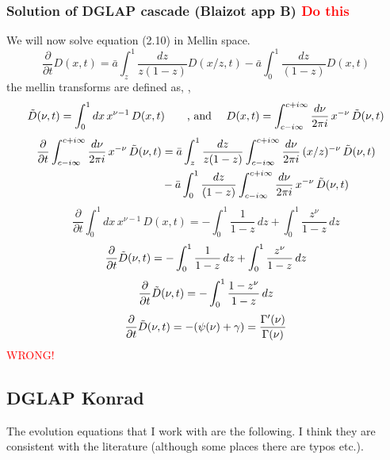 \documentclass[main.tex]{subfiles}
\begin{document}
\subsubsection{Solution of DGLAP cascade (Blaizot app B) \textcolor{red}{Do this}}
We will now solve equation (2.10) in Mellin space.
\begin{equation}\label{eqn: blaizot_2.10}
    \frac{\partial}{\partial t} D(x,t) = \bar a \int_z^1 \frac{dz}{z(1-z)} D(x/z,t) - \bar a \int_0^1 \frac{dz}{(1-z)} D(x,t)
\end{equation}
the mellin transforms are defined as, \cite{Energy_flow_medium_cascade_2016},
\begin{equation*}\label{eqn: mellin_transforms}
    \Tilde{D}(\nu, t) = \int_0^1 dx\, x^{\nu-1} \, D(x,t) \qquad \text{, and }\quad D(x,t) = \int_{c-i\infty}^{c+i\infty} \frac{d\nu}{2\pi i}\, x^{-\nu} \, \Tilde{D}(\nu, t)
\end{equation*}
\begin{align*}
    \frac{\partial}{\partial t} \int_{c-i\infty}^{c+i\infty} \frac{d\nu}{2\pi i}\, x^{-\nu} \, \Tilde{D}(\nu, t) &= \bar a \int_z^1 \frac{dz}{z(1-z)} \int_{c-i\infty}^{c+i\infty} \frac{d\nu}{2\pi i}\, (x/z)^{-\nu} \, \Tilde{D}(\nu, t) \\
    &- \bar a \int_0^1 \frac{dz}{(1-z)} \int_{c-i\infty}^{c+i\infty} \frac{d\nu}{2\pi i}\, x^{-\nu} \, \Tilde{D}(\nu, t)
\end{align*}
\begin{equation*}
    \frac{\partial}{\partial t} \int_0^1 dx\, x^{\nu-1} \, D(x,t) = -\int_0^1 \frac{1}{1-z}\, dz +\int_0^1 \frac{z^\nu}{1-z}\, dz 
\end{equation*}
\begin{equation*}
    \frac{\partial}{\partial t} \Tilde{D}(\nu, t) = -\int_0^1 \frac{1}{1-z}\, dz +\int_0^1 \frac{z^\nu}{1-z}\, dz 
\end{equation*}
\begin{equation*}
    \frac{\partial}{\partial t} \Tilde{D}(\nu, t) = -\int_0^1 \frac{1-z^\nu}{1-z}\, dz 
\end{equation*}
\begin{equation*}
    \frac{\partial}{\partial t} \Tilde{D}(\nu, t) = -(\psi(\nu)+\gamma) = \frac{\Gamma'(\nu)}{\Gamma(\nu)}
\end{equation*}
\textcolor{red}{WRONG!}

\subsection{DGLAP Konrad }
The evolution equations that I work with are the following. I think they are consistent with the literature (although some places there are typos etc.).
\end{document}

